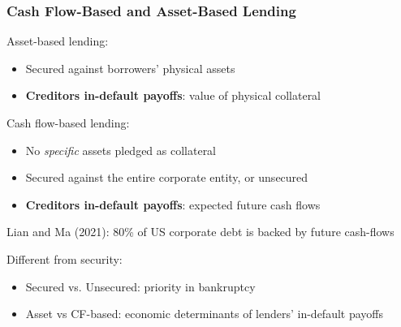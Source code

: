 \documentclass[aspectratio=169,xcolor=table]{beamer}
\begin{document}
\begin{frame}[label = LandM] \frametitle{Cash Flow-Based and Asset-Based Lending \hfill \hyperlink{motivation1}{}}

Asset-based lending:
\begin{itemize} \small
\item Secured against borrowers' physical  assets
\item \textbf{Creditors in-default payoffs}: value of physical collateral
\end{itemize} \normalsize 
Cash flow-based lending:
\begin{itemize} \small
\item No \textit{specific} assets pledged as collateral
\item Secured against the entire corporate entity, or unsecured
\item \textbf{Creditors in-default payoffs}: expected future cash flows
\end{itemize} \normalsize
Lian and Ma (2021): 80\% of US corporate debt is backed by future cash-flows \vspace{3mm}

Different from security: 
\begin{itemize} \small
    \item Secured vs. Unsecured: priority in bankruptcy
        \item Asset vs CF-based: economic determinants of lenders' in-default payoffs
\end{itemize} \normalsize

\end{frame}
\end{document}
